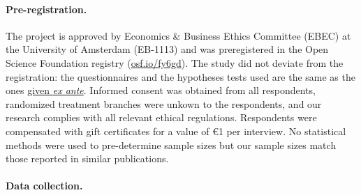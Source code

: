 \begin{bibunit}
\begin{small}
\paragraph{\small Pre-registration.}
The project is approved by Economics \& Business Ethics Committee (EBEC) at the University of Amsterdam (EB-1113) and %
was preregistered in the Open Science Foundation registry (\href{https://osf.io/fy6gd}{osf.io/fy6gd}). The study did not deviate from the registration: the questionnaires and the hypotheses tests used are the same as the ones \href{https://osf.io/2b6vq}{given \textit{ex ante}}. Informed consent was obtained from all respondents, randomized treatment branches were unkown to the respondents, and our research complies with all relevant ethical regulations. Respondents were compensated with gift certificates for a value of \euro{}1 per interview. No statistical methods were used to pre-determine sample sizes but our sample sizes match those reported in similar publications.\citep{dechezlepretre_fighting_nodate,issp_international_2010,beiser-mcgrath_could_2019,sivonen_attitudes_2022,douenne_yellow_2022}

\paragraph{\small Data collection.} %


\end{small}
\end{bibunit}
